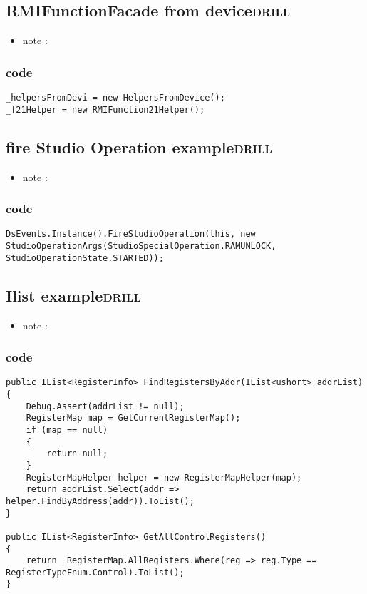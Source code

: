 \documentclass[11pt]{article}
\begin{document}
\subsection{RMIFunctionFacade from device\hfill{}\textsc{drill}}
\label{sec:org20725c2}
\begin{itemize}
\item note :
\end{itemize}
\subsubsection{code}
\label{sec:org60ba616}
\begin{verbatim}
_helpersFromDevi = new HelpersFromDevice();
_f21Helper = new RMIFunction21Helper();

\end{verbatim}

\subsection{fire Studio Operation example\hfill{}\textsc{drill}}
\label{sec:org2694ee8}
\begin{itemize}
\item note :
\end{itemize}
\subsubsection{code}
\label{sec:org76b4f45}
\begin{verbatim}
DsEvents.Instance().FireStudioOperation(this, new StudioOperationArgs(StudioSpecialOperation.RAMUNLOCK, StudioOperationState.STARTED));

\end{verbatim}

\subsection{Ilist example\hfill{}\textsc{drill}}
\label{sec:org6120381}
\begin{itemize}
\item note :
\end{itemize}
\subsubsection{code}
\label{sec:org8cc2104}
\begin{verbatim}
public IList<RegisterInfo> FindRegistersByAddr(IList<ushort> addrList)
{
    Debug.Assert(addrList != null);
    RegisterMap map = GetCurrentRegisterMap();
    if (map == null)
    {
        return null;
    }
    RegisterMapHelper helper = new RegisterMapHelper(map);
    return addrList.Select(addr => helper.FindByAddress(addr)).ToList();
}

public IList<RegisterInfo> GetAllControlRegisters()
{
    return _RegisterMap.AllRegisters.Where(reg => reg.Type == RegisterTypeEnum.Control).ToList();
}

\end{verbatim}
\end{document}
